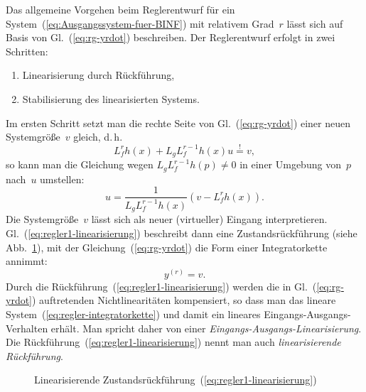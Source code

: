 Das allgemeine Vorgehen beim Reglerentwurf für ein System~(\ref{eq:Ausgangssystem-fuer-BINF})
mit relativem Grad~$r$ lässt sich auf Basis von Gl.~(\ref{eq:rg-yrdot})
beschreiben. Der Reglerentwurf erfolgt in zwei Schritten:
\begin{enumerate}
\item Linearisierung durch Rückführung,
\item Stabilisierung des linearisierten Systems.
\end{enumerate}
Im ersten Schritt setzt man die rechte Seite von Gl.~(\ref{eq:rg-yrdot})
einer neuen Systemgröße~$v$ gleich, d.\,h. 
\begin{equation}
L_{f}^{r}h(x)+L_{g}L_{f}^{r-1}h(x)u\stackrel{!}{=}v,\label{eq:regler1-linearisierung-forderung}
\end{equation}
so kann man die Gleichung wegen $L_{g}L_{f}^{r-1}h(p)\neq0$ in einer
Umgebung von~$p$ nach~$u$ umstellen: 
\begin{equation}
u=\frac{1}{L_{g}L_{f}^{r-1}h(x)}\left(v-L_{f}^{r}h(x)\right).\label{eq:regler1-linearisierung}
\end{equation}
Die Systemgröße~$v$ lässt sich als neuer (virtueller) Eingang interpretieren.
Gl.~(\ref{eq:regler1-linearisierung}) beschreibt dann eine Zustandsrückführung
(siehe Abb.~\ref{fig:linearisierende-Zustandsrueckfuehrung}), mit
der Gleichung~(\ref{eq:rg-yrdot}) die Form einer Integratorkette
annimmt: 
\begin{equation}
y^{(r)}=v.\label{eq:regler-integratorkette}
\end{equation}
Durch die Rückführung~(\ref{eq:regler1-linearisierung}) werden die
in Gl.~(\ref{eq:rg-yrdot}) auftretenden Nichtlinearitäten kompensiert,
so dass man das lineare System~(\ref{eq:regler-integratorkette})
und damit ein lineares Eingangs-Ausgangs-Verhalten erhält. Man spricht
daher von einer \emph{Eingangs-Ausgangs-Linearisierung}. Die Rückführung~(\ref{eq:regler1-linearisierung})
nennt man auch \emph{linearisierende Rückführung}.

\begin{figure}
\begin{centering}
\resizebox{0.99\textwidth}{!}{}
\par\end{centering}
\caption{Linearisierende Zustandsrückführung~(\ref{eq:regler1-linearisierung})\label{fig:linearisierende-Zustandsrueckfuehrung}}
\end{figure}


